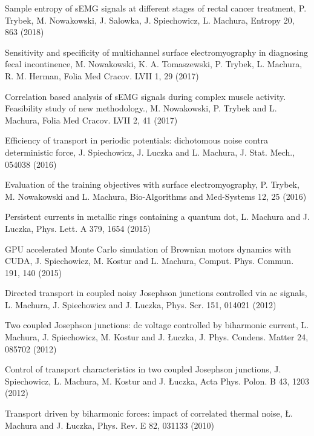 \begin{etaremune}
\item  Sample entropy of sEMG signals at different stages of rectal cancer treatment, P. Trybek, M. Nowakowski, J. Salowka, J. Spiechowicz, L. Machura, Entropy 20,  863 (2018)

\item Sensitivity and specificity of multichannel surface electromyography in diagnosing fecal incontinence, M. Nowakowski, K. A. Tomaszewski, P. Trybek, L. Machura, R. M. Herman, Folia Med Cracov. LVII 1,  29 (2017)

\item Correlation based analysis of sEMG signals during complex muscle activity. Feasibility study of new methodology., M. Nowakowski, P. Trybek and L. Machura, Folia Med Cracov. LVII 2,  41 (2017)

\item Efficiency of transport in periodic potentials: dichotomous noise contra deterministic force, J. Spiechowicz,  J. Luczka and L. Machura, J. Stat. Mech.,  054038 (2016)

\item Evaluation of the training objectives with surface electromyography, P. Trybek, M. Nowakowski and L. Machura, Bio-Algorithms and Med-Systems 12,  25 (2016)

\item Persistent currents in metallic rings containing a quantum dot, L. Machura and J. Luczka, Phys. Lett. A 379,  1654 (2015)

\item GPU accelerated Monte Carlo simulation of Brownian motors dynamics with CUDA, J. Spiechowicz, M. Kostur and L. Machura, Comput. Phys. Commun. 191,  140 (2015)

\item Directed transport in coupled noisy Josephson junctions controlled via ac signals, L. Machura, J. Spiechowicz and J. Luczka, Phys. Scr. 151,  014021 (2012) 

\item Two coupled Josephson junctions: dc voltage controlled by biharmonic current, L. Machura, J. Spiechowicz, M. Kostur and J. Łuczka, J. Phys. Condens. Matter 24,  085702 (2012)

\item Control of transport characteristics in two coupled Josephson junctions, J. Spiechowicz, L. Machura, M. Kostur and J. Łuczka, Acta Phys. Polon. B 43,  1203 (2012) 

\item Transport driven by biharmonic forces: impact of correlated thermal noise, Ł. Machura and J. Łuczka, Phys. Rev. E 82,  031133 (2010)


\end{etaremune}
